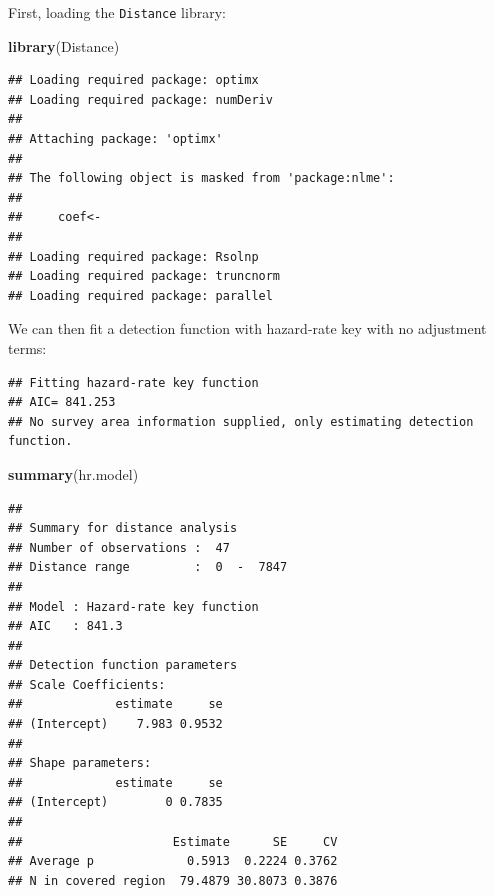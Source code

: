 \documentclass[]{article}
\newenvironment{Shaded}{}{}
\newcommand{\KeywordTok}[1]{\textcolor[rgb]{0.00,0.44,0.13}{\textbf{{#1}}}}
\newcommand{\DataTypeTok}[1]{\textcolor[rgb]{0.56,0.13,0.00}{{#1}}}
\newcommand{\StringTok}[1]{\textcolor[rgb]{0.25,0.44,0.63}{{#1}}}
\newcommand{\OtherTok}[1]{\textcolor[rgb]{0.00,0.44,0.13}{{#1}}}
\newcommand{\NormalTok}[1]{{#1}}
\begin{document}
First, loading the \texttt{Distance} library:

\begin{Shaded}
\begin{Highlighting}[]
\KeywordTok{library}\NormalTok{(Distance)}
\end{Highlighting}
\end{Shaded}

\begin{verbatim}
## Loading required package: optimx
## Loading required package: numDeriv
## 
## Attaching package: 'optimx'
## 
## The following object is masked from 'package:nlme':
## 
##     coef<-
## 
## Loading required package: Rsolnp
## Loading required package: truncnorm
## Loading required package: parallel
\end{verbatim}

We can then fit a detection function with hazard-rate key with no
adjustment terms:

\begin{Shaded}
\end{Shaded}

\begin{verbatim}
## Fitting hazard-rate key function
## AIC= 841.253
## No survey area information supplied, only estimating detection function.
\end{verbatim}

\begin{Shaded}
\begin{Highlighting}[]
\KeywordTok{summary}\NormalTok{(hr.model)}
\end{Highlighting}
\end{Shaded}

\begin{verbatim}
## 
## Summary for distance analysis 
## Number of observations :  47 
## Distance range         :  0  -  7847 
## 
## Model : Hazard-rate key function 
## AIC   : 841.3 
## 
## Detection function parameters
## Scale Coefficients:  
##             estimate     se
## (Intercept)    7.983 0.9532
## 
## Shape parameters:  
##             estimate     se
## (Intercept)        0 0.7835
## 
##                     Estimate      SE     CV
## Average p             0.5913  0.2224 0.3762
## N in covered region  79.4879 30.8073 0.3876
\end{verbatim}
\end{document}

